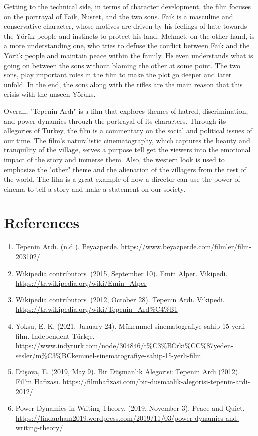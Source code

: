 \documentclass[12pt]{article}
\begin{document}
\par
Getting to the technical side, in terms of character development, the film focuses on the portrayal of Faik, Nusret, and the two sons. Faik is a masculine and conservative character, whose motives are driven by his feelings of hate towards the Yörük people and instincts to protect his land. Mehmet, on the other hand, is a more understanding one, who tries to defuse the conflict between Faik and the Yörük people and maintain peace within the family. He even understands what is going on between the sons without blaming the other at some point. The two sons, play important roles in the film to make the plot go deeper and later unfold. In the end, the sons along with the rifles are the main reason that this crisis with the unseen Yörüks.
\\
\par
Overall, "Tepenin Ardı" is a film that explores themes of hatred, discrimination, and power dynamics through the portrayal of its characters. Through its allegories of Turkey, the film is a commentary on the social and political issues of our time. The film's naturalistic cinematography, which captures the beauty and tranquility of the village, serves a purpose tell get the viewers into the emotional impact of the story and immerse them. Also, the western look is used to emphasize the "other" theme and the alienation of the villagers from the rest of the world. The film is a great example of how a director can use the power of cinema to tell a story and make a statement on our society.

\section*{References}

\begin{enumerate}
        \item Tepenin Ardı. (n.d.). Beyazperde. \url{https://www.beyazperde.com/filmler/film-203102/}
        \item Wikipedia contributors. (2015, September 10). Emin Alper. Vikipedi. \url{https://tr.wikipedia.org/wiki/Emin_Alper}
        \item Wikipedia contributors. (2012, October 28). Tepenin Ardı. Vikipedi. \url{https://tr.wikipedia.org/wiki/Tepenin_Ard%C4%B1}
        \item Yoksu, E. K. (2021, January 24). Mükemmel sinematografiye sahip 15 yerli film. Independent Türkçe. \url{https://www.indyturk.com/node/304846/t%C3%BCrki%CC%87yeden-sesler/m%C3%BCkemmel-sinematografiye-sahip-15-yerli-film}
        \item Düşova, E. (2019, May 9). Bir Düşmanlık Alegorisi: Tepenin Ardı (2012). Fil’m Hafızası. \url{https://filmhafizasi.com/bir-dusmanlik-alegorisi-tepenin-ardi-2012/}
        \item Power Dynamics in Writing Theory. (2019, November 3). Peace and Quiet. \url{https://lindapham2019.wordpress.com/2019/11/03/power-dynamics-and-writing-theory/}
\end{enumerate}
\end{document}
